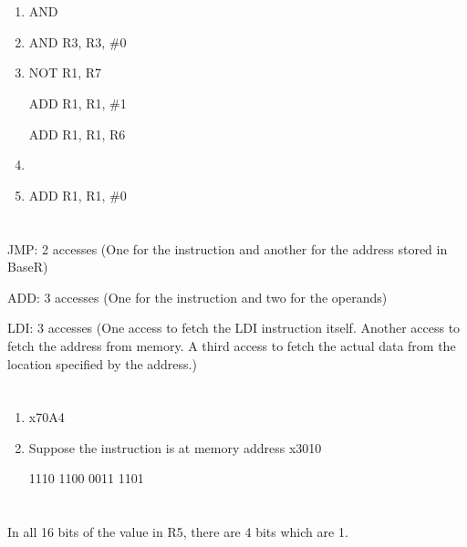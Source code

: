 \documentclass[UTF8]{ctexart}
\begin{document}
\section{} %
\begin{enumerate}
  \item AND 
  \item AND R3, R3, \#0
  \item NOT R1, R7

        ADD R1, R1, \#1

        ADD R1, R1, R6
  \item 
  \item ADD R1, R1, \#0
\end{enumerate} 

\section{} %
JMP: 2 accesses (One for the instruction and another for the address stored in BaseR)

ADD: 3 accesses (One for the instruction and two for the operands)

LDI: 3 accesses (One access to fetch the LDI instruction itself.
Another access to fetch the address from memory.
A third access to fetch the actual data from the location specified by the address.)
\section{} %
\begin{enumerate}
  \item x70A4
  \item Suppose the instruction is at memory address x3010
  
        1110 1100 0011 1101
\end{enumerate}
\section{} %
In all 16 bits of the value in R5, there are 4 bits which are 1.
\end{document}
